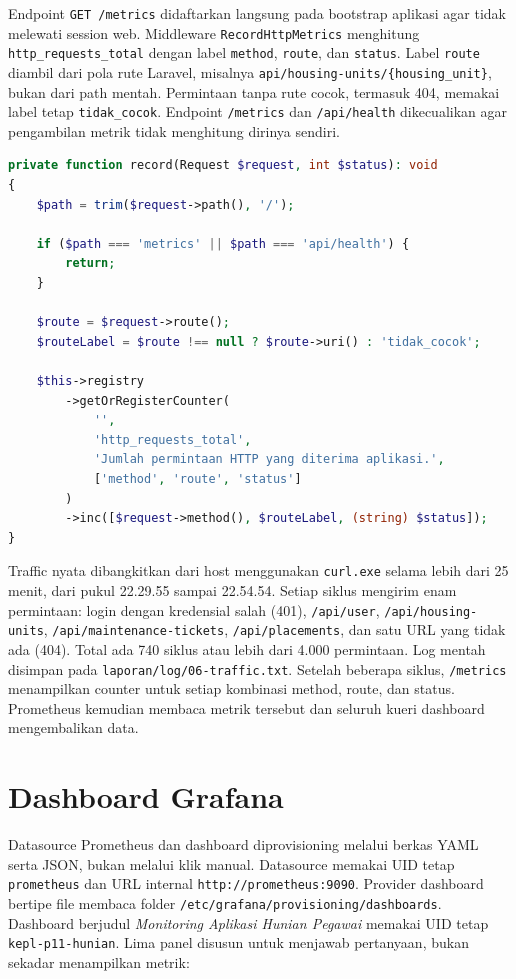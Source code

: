 \documentclass[a4paper,oneside,11pt]{book}
\begin{document}
Endpoint \texttt{GET /metrics} didaftarkan langsung pada bootstrap aplikasi agar tidak melewati session web. Middleware \texttt{RecordHttpMetrics} menghitung \texttt{http\_requests\_total} dengan label \texttt{method}, \texttt{route}, dan \texttt{status}. Label \texttt{route} diambil dari pola rute Laravel, misalnya \texttt{api/housing-units/\{housing\_unit\}}, bukan dari path mentah. Permintaan tanpa rute cocok, termasuk 404, memakai label tetap \texttt{tidak\_cocok}. Endpoint \texttt{/metrics} dan \texttt{/api/health} dikecualikan agar pengambilan metrik tidak menghitung dirinya sendiri.

\begin{lstlisting}[language=PHP,style=htmlstyle]
private function record(Request $request, int $status): void
{
    $path = trim($request->path(), '/');

    if ($path === 'metrics' || $path === 'api/health') {
        return;
    }

    $route = $request->route();
    $routeLabel = $route !== null ? $route->uri() : 'tidak_cocok';

    $this->registry
        ->getOrRegisterCounter(
            '',
            'http_requests_total',
            'Jumlah permintaan HTTP yang diterima aplikasi.',
            ['method', 'route', 'status']
        )
        ->inc([$request->method(), $routeLabel, (string) $status]);
}
\end{lstlisting}

Traffic nyata dibangkitkan dari host menggunakan \texttt{curl.exe} selama lebih dari 25 menit, dari pukul 22.29.55 sampai 22.54.54. Setiap siklus mengirim enam permintaan: login dengan kredensial salah (401), \texttt{/api/user}, \texttt{/api/housing-units}, \texttt{/api/maintenance-tickets}, \texttt{/api/placements}, dan satu URL yang tidak ada (404). Total ada 740 siklus atau lebih dari 4.000 permintaan. Log mentah disimpan pada \texttt{laporan/log/06-traffic.txt}. Setelah beberapa siklus, \texttt{/metrics} menampilkan counter untuk setiap kombinasi method, route, dan status. Prometheus kemudian membaca metrik tersebut dan seluruh kueri dashboard mengembalikan data.

\section{Dashboard Grafana}
Datasource Prometheus dan dashboard diprovisioning melalui berkas YAML serta JSON, bukan melalui klik manual. Datasource memakai UID tetap \texttt{prometheus} dan URL internal \texttt{http://prometheus:9090}. Provider dashboard bertipe file membaca folder \texttt{/etc/grafana/provisioning/dashboards}. Dashboard berjudul \emph{Monitoring Aplikasi Hunian Pegawai} memakai UID tetap \texttt{kepl-p11-hunian}. Lima panel disusun untuk menjawab pertanyaan, bukan sekadar menampilkan metrik:
\end{document}

